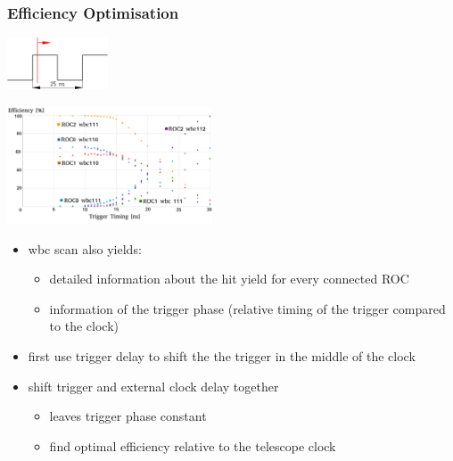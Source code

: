 \documentclass[9pt]{beamer}
\begin{document}
\begin{frame}
	\frametitle{Efficiency Optimisation}
	\begin{center}
		\begin{minipage}{3cm}
			\centering
			\includegraphics[width=3cm]{ClockCycle}
		\end{minipage}
		\begin{minipage}{8cm}
			\centering
			\includegraphics[height=3.5cm]{Pics/optimisation}
		\end{minipage}
	\end{center}
	\begin{itemize}
		\setlength{\itemsep}{\fill}
		\item wbc scan also yields:
			\begin{itemize}
				\item detailed information about the hit yield for every connected ROC
				\item information of the trigger phase (relative timing of the trigger compared to the clock)
			\end{itemize}
		\item first use trigger delay to shift the the trigger in the middle of the clock
		\item shift trigger and external clock delay together
		\begin{itemize}
			\item leaves trigger phase constant
			\item find optimal efficiency relative to the telescope clock
		\end{itemize}
	\end{itemize}
\end{frame}
\end{document}
